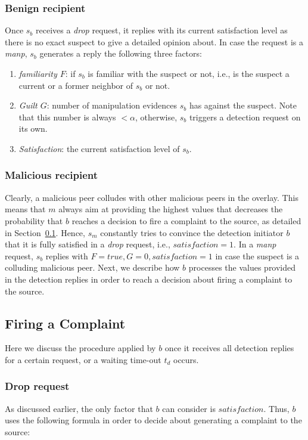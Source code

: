 \subsubsection*{Benign recipient}
Once $s_b$ receives a \textit{drop} request, it replies with its current satisfaction level as there is no exact suspect to give a detailed opinion about.
In case the request is a \textit{manp}, $s_b$ generates a reply the following three factors:
\begin{enumerate}
 \item \textit{familiarity $F$}: if $s_b$ is familiar with the suspect or not, i.e., is the suspect a current or a former neighbor of $s_b$ or not.
 \item \textit{Guilt $G$}: number of manipulation evidences $s_b$ has against the suspect. Note that this number is always $<\alpha$, otherwise, $s_b$ triggers a detection request on its own.
 \item \textit{Satisfaction}: the current satisfaction level of $s_b$.
\end{enumerate}


\subsubsection*{Malicious recipient}
Clearly, a malicious peer colludes with other malicious peers in the overlay. 
This means that $m$ always aim at providing the highest values that decreases the probability that $b$ reaches a decision to fire a complaint to the source, as detailed in Section~\ref{Firing_a_Complain}.
Hence, $s_m$ constantly tries to convince the detection initiator $b$ that it is fully satisfied in a \textit{drop} request, i.e., $satisfaction =1$.
In a \textit{manp} request, $s_b$ replies with $F=true, G=0, satisfaction=1$ in case the suspect is a colluding malicious peer.
Next, we describe how $b$ processes the values provided in the detection replies in order to reach a decision about firing a complaint to the source.

\subsection{Firing a Complaint}
\label{Firing_a_Complain}
Here we discuss the procedure applied by $b$ once it receives all detection replies for a certain request, or a waiting time-out $t_d$ occurs.
\subsubsection*{Drop request}
As discussed earlier, the only factor that $b$ can consider is $satisfaction$.
Thus, $b$ uses the following formula in order to decide about generating a complaint to the source:

